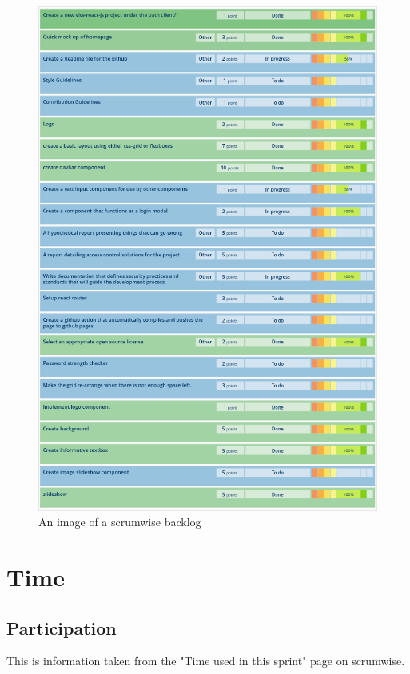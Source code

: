 \documentclass[12pt]{article}
\begin{document}
\begin{figure}[h]
    \begin{adjustwidth}{-1in}{-1in}
        \centering
        \includegraphics[scale=0.5]{backlog.png}
        \caption{An image of a scrumwise backlog}
        \label{fig:BL2}
    \end{adjustwidth}
\end{figure}
\clearpage

\section{Time}
\subsection{Participation}
This is information taken from the "Time used in this sprint" page on scrumwise.
\end{document}
